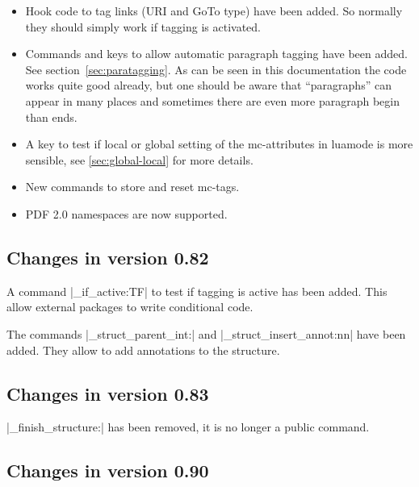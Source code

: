 \documentclass[DIV=12,parskip=half-,bibliography=totoc]{scrartcl}
\begin{document}
\begin{itemize}
\item Hook code to tag links (URI and GoTo type) have been added. So normally they should simply work if tagging
is activated.

\item Commands and keys to allow automatic paragraph tagging have been added. See section~\ref{sec:paratagging}.
As can be seen in this documentation the code works quite good already, but one should be aware that \enquote{paragraphs} can appear in many places and sometimes there are even more paragraph begin than ends.

\item A key to test if local or global setting of the mc-attributes in luamode is more sensible, see \ref{sec:global-local} for more details.

\item New commands to store and reset mc-tags.

\item PDF 2.0 namespaces are now supported.
\end{itemize}

\subsection{Changes in version 0.82}

A command |\tag_if_active:TF| to test if tagging is active has been added. This allow external packages to write conditional code.

The commands |\tag_struct_parent_int:| and |\tag_struct_insert_annot:nn| have been added. They allow to
add annotations to the structure.


\subsection{Changes in version 0.83}

|\tag_finish_structure:| has been removed, it is no longer a public command.

\subsection{Changes in version 0.90}
\end{document}

